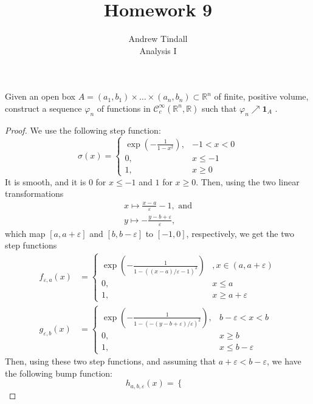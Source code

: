 \documentclass[12pt]{article}
\newcommand{\R}{\mathbb{R}}
\theoremstyle{definition}
\newenvironment{problem}[2][Problem]{\begin{trivlist}
\item[\hskip \labelsep {\bfseries #1}\hskip \labelsep {\bfseries #2.}]}{\end{trivlist}}
\begin{document}
 
 
\title{ Homework 9}
\author{Andrew Tindall\\
Analysis I}
 
\maketitle
\begin{problem}{1}
	Given an open box $A = (a_1, b_1)\times \dots \times (a_n, b_n) \subset \R^n$ of finite, positive volume, construct a sequence $\varphi_n$ of functions in $\mathcal{C}^\infty_c(\R^n, \R)$ such that $\varphi_n \nearrow \mathbf{1}_A$	.
	\begin{proof}
		We use the following step function:
		\[\sigma(x) = \begin{cases}
				\exp\left( -\frac{1}{1 - x^2} \right), & -1 < x < 0\\
				0, & x \leq -1\\
				1, & x \geq 0
	\end{cases}\]
	It is smooth, and it is $0$ for $x \leq -1$ and $1$ for $x \geq 0$. Then, using the two linear transformations
	\begin{align*}
		x \mapsto \frac{x-a}{\varepsilon} - 1, \text{ and}\\
		y \mapsto -\frac{y - b+\varepsilon}{\varepsilon},
	\end{align*}which map $[a, a +\varepsilon]$ and $[b, b- \varepsilon]$ to $[-1, 0]$, respectively, we get the two step functions
		\begin{align*}f_{\varepsilon,a}(x) &= \begin{cases}
				\exp\left( -\frac{1}{1 - ((x-a)/\varepsilon - 1)^2} \right) &, x \in (a, a + \varepsilon)\\
				0, & x \leq a\\
				1, & x \geq a + \varepsilon
		\end{cases}\\
		g_{\varepsilon,b}(x) &=
		\begin{cases}
			\exp\left( -\frac{1}{1-(-(y-b+\varepsilon)/\varepsilon)^2} \right), & b-\varepsilon < x < b\\
			0, & x \geq b\\
			1, & x \leq b-\varepsilon
	\end{cases}\end{align*}
	Then, using these two step functions, and assuming that $a+ \varepsilon < b -\varepsilon$, we have the following bump function:
	\[h_{a,b,\varepsilon}(x) = \begin{cases}

\end{cases}\]
\end{proof}
\end{problem}
\end{document}
